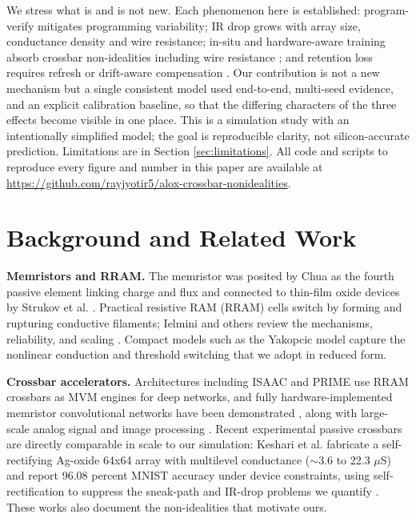 \documentclass[conference]{IEEEtran}
\begin{document}
We stress what is and is not new. Each phenomenon here is established:
program-verify mitigates programming variability; IR drop grows with array size,
conductance density and wire resistance; in-situ and hardware-aware training
absorb crossbar non-idealities including wire resistance \cite{prezioso2015,
liNComm2018, he2019, rasch2023}; and retention loss requires refresh or
drift-aware compensation \cite{joshi2020}. Our contribution is not a new
mechanism but a single consistent model used end-to-end, multi-seed evidence,
and an explicit calibration baseline, so that the differing characters of the
three effects become visible in one place. This is a simulation study with an
intentionally simplified model; the goal is reproducible clarity, not
silicon-accurate prediction. Limitations are in Section \ref{sec:limitations}.
All code and scripts to reproduce every figure and number in this paper are
available at \url{https://github.com/rayjyotir5/alox-crossbar-nonidealities}.

\section{Background and Related Work}
\label{sec:relwork}
\textbf{Memristors and RRAM.} The memristor was posited by Chua as the fourth
passive element linking charge and flux \cite{chua1971} and connected to
thin-film oxide devices by Strukov et al. \cite{strukov2008}. Practical resistive
RAM (RRAM) cells switch by forming and rupturing conductive filaments; Ielmini
and others review the mechanisms, reliability, and scaling
\cite{ielmini2016, ielmini2018}. Compact models such as the Yakopcic model
\cite{yakopcic2011} capture the nonlinear conduction and threshold switching that
we adopt in reduced form.

\textbf{Crossbar accelerators.} Architectures including ISAAC \cite{shafiee2016}
and PRIME \cite{chi2016} use RRAM crossbars as MVM engines for deep networks,
and fully hardware-implemented memristor convolutional networks have been
demonstrated \cite{yao2020}, along with large-scale analog signal and image
processing \cite{li2018}. Recent experimental passive crossbars are directly
comparable in scale to our simulation: Keshari et al. fabricate a self-rectifying
Ag-oxide 64x64 array with multilevel conductance ($\sim$3.6 to 22.3 $\mu$S) and
report 96.08 percent MNIST accuracy under device constraints, using
self-rectification to suppress the sneak-path and IR-drop problems we quantify
\cite{keshari2026}. These works also document the non-idealities that motivate
ours.
\end{document}
